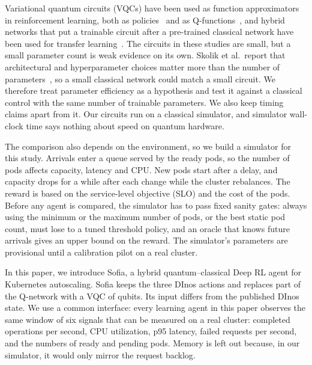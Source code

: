 Variational quantum circuits (VQCs) have been used as function approximators in reinforcement learning, both as
policies~\cite{jerbi2021parametrized} and as Q-functions~\cite{skolik2022quantum}, and hybrid networks that put a
trainable circuit after a pre-trained classical network have been used for transfer
learning~\cite{mari2020transfer}. The circuits in these studies are small, but a small parameter count is weak
evidence on its own. Skolik et al.\ report that architectural and hyperparameter choices matter more than
the number of parameters~\cite{skolik2022quantum}, so a small classical network could match a small circuit. We
therefore treat parameter efficiency as a hypothesis and test it against a classical control with the same number
of trainable parameters. We also keep timing claims apart from it. Our circuits run on a classical simulator, and
simulator wall-clock time says nothing about speed on quantum hardware.

The comparison also depends on the environment, so we build a simulator for this study. Arrivals enter a queue
served by the ready pods, so the number of pods affects capacity, latency and CPU. New pods start after a delay,
and capacity drops for a while after each change while the cluster rebalances. The reward is based on the
service-level objective (SLO) and the cost of the pods. Before any agent is compared, the simulator has to pass
fixed sanity gates: always using the minimum or the maximum number of pods, or the best static pod count, must lose
to a tuned threshold policy, and an oracle that knows future arrivals gives an upper bound on the reward. The
simulator's parameters are provisional until a calibration pilot on a real cluster.

In this paper, we introduce Sofia, a hybrid quantum--classical Deep RL agent for Kubernetes autoscaling. Sofia keeps the three DInos actions and replaces part of the Q-network with a VQC of \resQubits{}
qubits. Its input differs from the published
DInos state. We use a common
interface: every learning agent in this paper observes the same window of six signals that can be measured on a real
cluster: completed operations per second, CPU utilization, p95 latency, failed requests per second, and the
numbers of ready and pending pods. Memory is left out because, in our simulator, it would only mirror the
request backlog.

